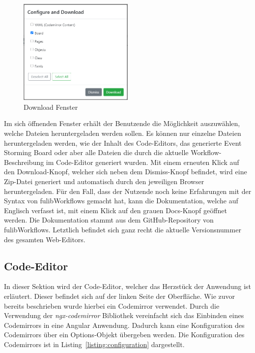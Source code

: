 \begin{figure}[h]
    \centering
    \includegraphics[width=0.5\textwidth]{images/3.2/download}
    \caption{Download Fenster}
    \label{fig:download}
\end{figure}

Im sich öffnenden Fenster erhält der Benutzende die Möglichkeit auszuwählen, welche Dateien heruntergeladen werden sollen.
Es können nur einzelne Dateien heruntergeladen werden, wie der Inhalt des Code-Editors, das generierte Event Storming Board oder aber alle Dateien
die durch die aktuelle Workflow-Beschreibung im Code-Editor generiert wurden.
Mit einem erneuten Klick auf den Download-Knopf, welcher sich neben dem Dismiss-Knopf befindet, wird eine Zip-Datei generiert und automatisch durch den jeweiligen Browser heruntergeladen.
Für den Fall, dass der Nutzende noch keine Erfahrungen mit der Syntax von fulibWorkflows gemacht hat, kann die Dokumentation, welche auf Englisch verfasst ist, mit einem Klick
auf den grauen Docs-Knopf geöffnet werden.
Die Dokumentation stammt aus dem GitHub-Repository von fulibWorkflows.
Letztlich befindet sich ganz recht die aktuelle Versionsnummer des gesamten Web-Editors.

\subsection{Code-Editor}\label{subsec:codeeditor}
In dieser Sektion wird der Code-Editor, welcher das Herzstück der Anwendung ist erläutert.
Dieser befindet sich auf der linken Seite der Oberfläche.
Wie zuvor bereits beschrieben wurde hierbei ein Codemirror verwendet.
Durch die Verwendung der \textit{ngx-codemirror} Bibliothek vereinfacht sich das Einbinden eines Codemirrors in eine Angular Anwendung.
Dadurch kann eine Konfiguration des Codemirrors über ein Options-Objekt übergeben werden.
Die Konfiguration des Codemirrors ist in Listing~\ref{listing:configuration} dargestellt.

